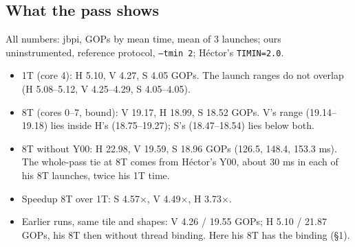 \subsection*{What the pass shows}
All numbers: jbpi, GOPs by mean time, mean of 3 launches; ours uninstrumented, reference protocol, \texttt{--tmin 2}; H\'ector's \texttt{TIMIN=2.0}.
\begin{itemize}\setlength\itemsep{1pt}
\item 1T (core 4): H 5.10, V 4.27, S 4.05 GOPs. The launch ranges do not overlap (H 5.08--5.12, V 4.25--4.29, S 4.05--4.05).
\item 8T (cores 0--7, bound): V 19.17, H 18.99, S 18.52 GOPs. V's range (19.14--19.18) lies inside H's (18.75--19.27); S's (18.47--18.54) lies below both.
\item 8T without Y00: H 22.98, V 19.59, S 18.96 GOPs (126.5, 148.4, 153.3 ms). The whole-pass tie at 8T comes from H\'ector's Y00, about 30 ms in each of his 8T launches, twice his 1T time.
\item Speedup 8T over 1T: S 4.57$\times$, V 4.49$\times$, H 3.73$\times$.
\item Earlier runs, same tile and shapes:  V 4.26 / 19.55 GOPs;  H 5.10 / 21.87 GOPs, his 8T then without thread binding. Here his 8T has the binding (\S1).
\end{itemize}
